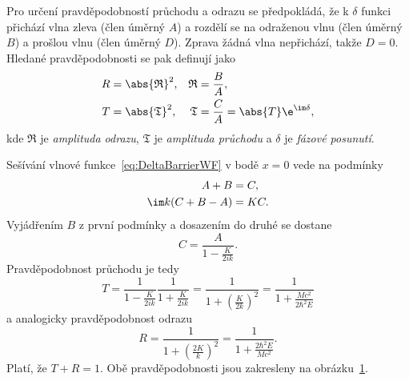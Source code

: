 \begin{solution}
\begin{enumerate}
		Pro určení pravděpodobností průchodu a odrazu se předpokládá, že k $\delta$ funkci přichází vlna zleva (člen úměrný $A$) a rozdělí se na odraženou vlnu (člen úměrný $B$) a prošlou vlnu (člen úměrný $D$).
		Zprava žádná vlna nepřichází, takže $D=0$.
		Hledané pravděpodobnosti se pak definují jako
		\begin{subequations}
			\begin{align}
				R&=\abs{\mathfrak{R}}^{2},
				&\mathfrak{R}&=\frac{B}{A},\\
				T&=\abs{\mathfrak{T}}^{2},
				&\mathfrak{T}&=\frac{C}{A}=\abs{T}\e^{\im\delta},
				\label{eq:PhaseShift}
			\end{align}
		\end{subequations}
		kde $\mathfrak{R}$ je \emph{amplituda odrazu}, $\mathfrak{T}$ je \emph{amplituda průchodu} a $\delta$ je \emph{fázové posunutí}.

		\begin{figure}[!htbp]
			\centering
			\label{fig:DeltaTR}
		\end{figure}

		Sešívání vlnové funkce~\eqref{eq:DeltaBarrierWF} v bodě $x=0$ vede na podmínky
		\begin{subequations}
			\begin{align}
				A+B&=C,\\
				\im k(C+B-A)&=KC.
			\end{align}
		\end{subequations}
		Vyjádřením $B$ z první podmínky a dosazením do druhé se dostane
		\begin{equation}
			C=\frac{A}{1-\frac{K}{2ik}}.
		\end{equation}
		Pravděpodobnost průchodu je tedy
		\begin{equation}
			T=\frac{1}{1-\frac{K}{2ik}}\frac{1}{1+\frac{K}{2ik}}
			 =\frac{1}{1+\left(\frac{K}{2k}\right)^{2}}
			 =\frac{1}{1+\frac{Mc^{2}}{2\hbar^{2}E}}
			\label{eq:DeltaT}
		\end{equation}
		a analogicky pravděpodobnost odrazu
		\begin{equation}
			R=\frac{1}{1+\left(\frac{2K}{k}\right)^{2}}
			 =\frac{1}{1+\frac{2\hbar^{2}E}{Mc^{2}}}.
			\label{eq:DeltaR}
		\end{equation}
        Platí, že $T+R=1$. 
        Obě pravděpodobnosti jsou zakresleny na obrázku~\ref{fig:DeltaTR}.
        

\end{enumerate}
\end{solution}
